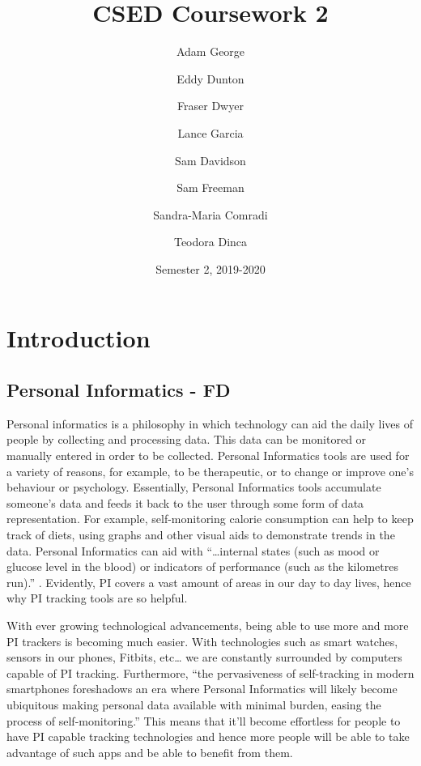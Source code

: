 \documentclass[11pt]{report}
\title{CSED Coursework 2}
\author{
	Adam George
	\and
	Eddy Dunton
	\and
	Fraser Dwyer
	\and	
	Lance Garcia
	\and
	Sam Davidson
	\and
	Sam Freeman
	\and
	Sandra-Maria Comradi
	\and
	Teodora Dinca
}
\date{Semester 2,  2019-2020}
\begin{document}
\begin{titlepage}
\maketitle
\end{titlepage}

\tableofcontents



\chapter{Introduction}


\section{Personal Informatics - FD}

Personal informatics is a philosophy in which technology can aid the daily lives of people by collecting and processing data. This data can be monitored or manually entered in order to be collected. Personal Informatics tools are used for a variety of reasons, for example, to be therapeutic, or to change or improve one’s behaviour or psychology. Essentially, Personal Informatics tools accumulate someone’s data and feeds it back to the user through some form of data representation. For example, self-monitoring calorie consumption can help to keep track of diets, using graphs and other visual aids to demonstrate trends in the data. Personal Informatics can aid with “…internal states (such as mood or glucose level in the blood) or indicators of performance (such as the kilometres run).”  \cite{Rapp2014a} . Evidently, PI covers a vast amount of areas in our day to day lives, hence why PI tracking tools are so helpful.

With ever growing technological advancements, being able to use more and more PI trackers is becoming much easier. With technologies such as smart watches, sensors in our phones, Fitbits, etc… we are constantly surrounded by computers capable of PI tracking. Furthermore, “the pervasiveness of self-tracking in modern smartphones foreshadows an era where Personal Informatics will likely become ubiquitous making personal data available with minimal burden, easing the process of self-monitoring.” This means that it’ll become effortless for people to have PI capable tracking technologies and hence more people will be able to take advantage of such apps and be able to benefit from them.\cite{Rapp2016}
\end{document}
